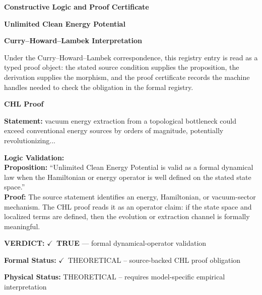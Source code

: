 \clearpage
\begingroup\tzpsupportsetup
\noindent\textbf{\fontsize{10.8pt}{12.8pt}\selectfont [ID 0172] Constructive Logic and Proof Certificate}\par
\noindent\textbf{\fontsize{10pt}{12pt}\selectfont Unlimited Clean Energy Potential}\par
\vspace{0.45em}
\begingroup
\footnotesize
\setlength{\parskip}{0.22em}
\setlength{\parindent}{0pt}
\noindent\textbf{Curry--Howard--Lambek Interpretation}\par
Under the Curry--Howard--Lambek correspondence, this registry entry is read as a typed proof
object: the stated source condition supplies the proposition, the derivation supplies the
morphism, and the proof certificate records the machine handles needed to check the obligation
in the formal registry.

\vspace{0.45em}
\noindent\textbf{CHL Proof}\par
\textbf{Statement:} vacuum energy extraction from a topological bottleneck could exceed conventional energy
sources by orders of magnitude, potentially revolutionizing...

\textbf{Logic Validation:}\\
\textbf{Proposition:} ``Unlimited Clean Energy Potential is valid as a formal dynamical law when the Hamiltonian
or energy operator is well defined on the stated state space.''\\
\textbf{Proof:} The source statement identifies an energy, Hamiltonian, or vacuum-sector mechanism. The
CHL proof reads it as an operator claim: if the state space and localized terms are
defined, then the evolution or extraction channel is formally meaningful.

\textbf{VERDICT:} \ensuremath{\checkmark}\ \textbf{TRUE} --- formal dynamical-operator validation

\textbf{Formal Status:} \ensuremath{\checkmark}\ THEORETICAL -- source-backed CHL proof obligation

\textbf{Physical Status:} THEORETICAL -- requires model-specific empirical interpretation
\par\vspace{0.45em}
\par
\ifTZPDarkEdition
{}
\fi
\endgroup
\endgroup
